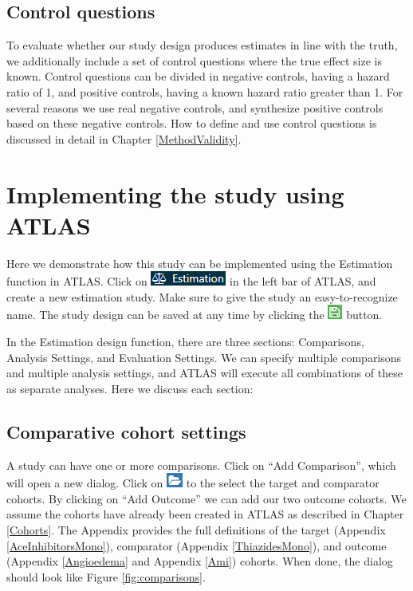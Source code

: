 \documentclass[11pt]{book}
\theoremstyle{definition}
\theoremstyle{definition}
\theoremstyle{definition}
\theoremstyle{remark}
\begin{document}
\hypertarget{control-questions}{%
\subsection{Control questions}\label{control-questions}}

To evaluate whether our study design produces estimates in line with the truth, we additionally include a set of control questions where the true effect size is known. Control questions can be divided in negative controls, having a hazard ratio of 1, and positive controls, having a known hazard ratio greater than 1. For several reasons we use real negative controls, and synthesize positive controls based on these negative controls. How to define and use control questions is discussed in detail in Chapter \ref{MethodValidity}.

\hypertarget{PleAtlas}{%
\section{Implementing the study using ATLAS}\label{PleAtlas}}

Here we demonstrate how this study can be implemented using the Estimation function in ATLAS. Click on \includegraphics{images/PopulationLevelEstimation/estimation.png} in the left bar of ATLAS, and create a new estimation study. Make sure to give the study an easy-to-recognize name. The study design can be saved at any time by clicking the \includegraphics{images/PopulationLevelEstimation/save.png} button.

In the Estimation design function, there are three sections: Comparisons, Analysis Settings, and Evaluation Settings. We can specify multiple comparisons and multiple analysis settings, and ATLAS will execute all combinations of these as separate analyses. Here we discuss each section:

\hypertarget{ComparisonSettings}{%
\subsection{Comparative cohort settings}\label{ComparisonSettings}}

A study can have one or more comparisons. Click on ``Add Comparison'', which will open a new dialog. Click on \includegraphics{images/PopulationLevelEstimation/open.png} to the select the target and comparator cohorts. By clicking on ``Add Outcome'' we can add our two outcome cohorts. We assume the cohorts have already been created in ATLAS as described in Chapter \ref{Cohorts}. The Appendix provides the full definitions of the target (Appendix \ref{AceInhibitorsMono}), comparator (Appendix \ref{ThiazidesMono}), and outcome (Appendix \ref{Angioedema} and Appendix \ref{Ami}) cohorts. When done, the dialog should look like Figure \ref{fig:comparisons}.
\end{document}
